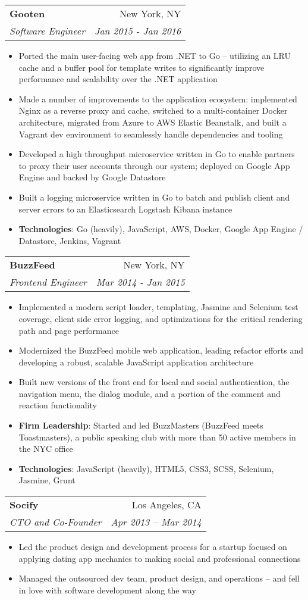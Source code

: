 \documentclass[letterpaper,11pt]{article}
\makeatletter
\newcommand{\resumeItem}[2]{
  \item\small{
    \textbf{#1}{: #2 \vspace{-1.5pt}}
  }
}
\newcommand{\resumeItemSimple}[1]{
  \item\small{
    {#1 \vspace{-1.5pt}}
  }
}
\newcommand{\resumeSubheading}[4]{
  \vspace{-1pt}\item
    \begin{tabular*}{0.97\textwidth}[t]{l@{\extracolsep{\fill}}r}
      \textbf{#1} & #2 \\
      \textit{\small#3} & \textit{\small #4} \\
    \end{tabular*}\vspace{-5pt}
}
\newcommand{\resumeItemListStart}{\begin{itemize}}
\newcommand{\resumeItemListEnd}{\end{itemize}\vspace{-5pt}}
\makeatother
\begin{document}
    \resumeSubheading
      {Gooten}{New York, NY}
      {Software Engineer}{Jan 2015 - Jan 2016}
      \resumeItemListStart
        \resumeItemSimple
          {Ported the main user-facing web app from .NET to Go -- utilizing an LRU cache and a buffer pool for template writes to significantly improve performance and scalability over the .NET application}
        \resumeItemSimple
          {Made a number of improvements to the application ecosystem: implemented Nginx as a reverse proxy and cache, switched to a multi-container Docker architecture, migrated from Azure to AWS Elastic Beanstalk, and built a Vagrant dev environment to seamlessly handle dependencies and tooling}
        \resumeItemSimple
          {Developed a high throughput microservice written in Go to enable partners to proxy their user accounts through our system; deployed on Google App Engine and backed by Google Datastore}
        \resumeItemSimple
          {Built a logging microservice written in Go to batch and publish client and server errors to an Elasticsearch Logstash Kibana instance}
        \resumeItem{Technologies}
        {Go (heavily), JavaScript, AWS, Docker, Google App Engine / Datastore, Jenkins, Vagrant}
      \resumeItemListEnd

    \resumeSubheading
      {BuzzFeed}{New York, NY}
      {Frontend Engineer}{Mar 2014 - Jan 2015}
      \resumeItemListStart
        \resumeItemSimple
          {Implemented a modern script loader, templating, Jasmine and Selenium test coverage, client side error logging, and optimizations for the critical rendering path and page performance}
        \resumeItemSimple
          {Modernized the BuzzFeed mobile web application, leading refactor efforts and developing a robust, scalable JavaScript application architecture}
        \resumeItemSimple
          {Built new versions of the front end for local and social authentication, the navigation menu, the dialog module, and a portion of the comment and reaction functionality}
        \resumeItem{Firm Leadership}
          {Started and led BuzzMasters (BuzzFeed meets Toastmasters), a public speaking club with more than 50 active members in the NYC office}
        \resumeItem{Technologies}
        {JavaScript (heavily), HTML5, CSS3, SCSS, Selenium, Jasmine, Grunt}
      \resumeItemListEnd
      
    \resumeSubheading
      {Socify}{Los Angeles, CA}
      {CTO and Co-Founder}{Apr 2013 – Mar 2014}
      \resumeItemListStart
        \resumeItemSimple
          {Led the product design and development process for a startup focused on applying dating app mechanics to making social and professional connections}
        \resumeItemSimple
          {Managed the outsourced dev team, product design, and operations -- and fell in love with software development along the way}
      \resumeItemListEnd
\end{document}
